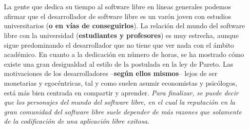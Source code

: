 \\
\\
La gente que dedica su tiempo al software libre en líneas generales podemos afirmar que el desarrollador de software libre es un varón joven con estudios universitarios ({\bf o en vías de conseguirlos}). La relación del mundo del software libre con la universidad ({\bf estudiantes y profesores}) es muy estrecha, aunque sigue predominando el desarrollador que no tiene que ver nada con el ámbito académico. En cuanto a la dedicación en número de horas, se ha mostrado cómo existe una gran desigualdad al estilo de la postulada en la ley de Pareto. 
Las motivaciones de los desarrolladores –{\bf según ellos mismos}– lejos de ser monetarias y egocéntricas, tal y como suelen asumir economistas y psicólogos, está más bien centrada en compartir y aprender. \emph{Para finalizar, se puede decir que los personajes del mundo del software libre, en el cual la reputación en la gran comunidad del software libre suele depender de más razones que solamente de la codificación de una aplicación libre exitosa}.
\\
\\
